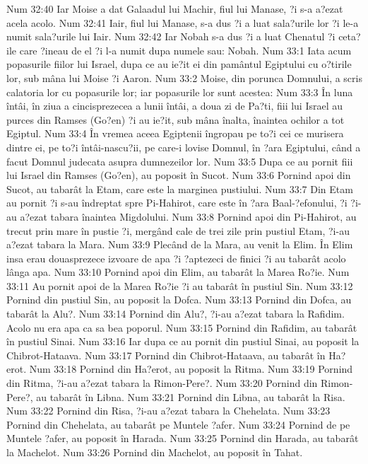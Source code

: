 Num 32:40  Iar Moise a dat Galaadul lui Machir, fiul lui Manase, ?i s-a a?ezat acela acolo.
Num 32:41  Iair, fiul lui Manase, s-a dus ?i a luat sala?urile lor ?i le-a numit sala?urile lui Iair.
Num 32:42  Iar Nobah s-a dus ?i a luat Chenatul ?i ceta?ile care ?ineau de el ?i l-a numit dupa numele sau: Nobah.
Num 33:1  Iata acum popasurile fiilor lui Israel, dupa ce au ie?it ei din pamântul Egiptului cu o?tirile lor, sub mâna lui Moise ?i Aaron.
Num 33:2  Moise, din porunca Domnului, a scris calatoria lor cu popasurile lor; iar popasurile lor sunt acestea:
Num 33:3  În luna întâi, în ziua a cincisprezecea a lunii întâi, a doua zi de Pa?ti, fiii lui Israel au purces din Ramses (Go?en) ?i au ie?it, sub mâna înalta, înaintea ochilor a tot Egiptul.
Num 33:4  În vremea aceea Egiptenii îngropau pe to?i cei ce murisera dintre ei, pe to?i întâi-nascu?ii, pe care-i lovise Domnul, în ?ara Egiptului, când a facut Domnul judecata asupra dumnezeilor lor.
Num 33:5  Dupa ce au pornit fiii lui Israel din Ramses (Go?en), au poposit în Sucot.
Num 33:6  Pornind apoi din Sucot, au tabarât la Etam, care este la marginea pustiului.
Num 33:7  Din Etam au pornit ?i s-au îndreptat spre Pi-Hahirot, care este în ?ara Baal-?efonului, ?i ?i-au a?ezat tabara înaintea Migdolului.
Num 33:8  Pornind apoi din Pi-Hahirot, au trecut prin mare în pustie ?i, mergând cale de trei zile prin pustiul Etam, ?i-au a?ezat tabara la Mara.
Num 33:9  Plecând de la Mara, au venit la Elim. În Elim insa erau douasprezece izvoare de apa ?i ?aptezeci de finici ?i au tabarât acolo lânga apa.
Num 33:10  Pornind apoi din Elim, au tabarât la Marea Ro?ie.
Num 33:11  Au pornit apoi de la Marea Ro?ie ?i au tabarât în pustiul Sin.
Num 33:12  Pornind din pustiul Sin, au poposit la Dofca.
Num 33:13  Pornind din Dofca, au tabarât la Alu?.
Num 33:14  Pornind din Alu?, ?i-au a?ezat tabara la Rafidim. Acolo nu era apa ca sa bea poporul.
Num 33:15  Pornind din Rafidim, au tabarât în pustiul Sinai.
Num 33:16  Iar dupa ce au pornit din pustiul Sinai, au poposit la Chibrot-Hataava.
Num 33:17  Pornind din Chibrot-Hataava, au tabarât în Ha?erot.
Num 33:18  Pornind din Ha?erot, au poposit la Ritma.
Num 33:19  Pornind din Ritma, ?i-au a?ezat tabara la Rimon-Pere?.
Num 33:20  Pornind din Rimon-Pere?, au tabarât în Libna.
Num 33:21  Pornind din Libna, au tabarât la Risa.
Num 33:22  Pornind din Risa, ?i-au a?ezat tabara la Chehelata.
Num 33:23  Pornind din Chehelata, au tabarât pe Muntele ?afer.
Num 33:24  Pornind de pe Muntele ?afer, au poposit în Harada.
Num 33:25  Pornind din Harada, au tabarât la Machelot.
Num 33:26  Pornind din Machelot, au poposit în Tahat.
